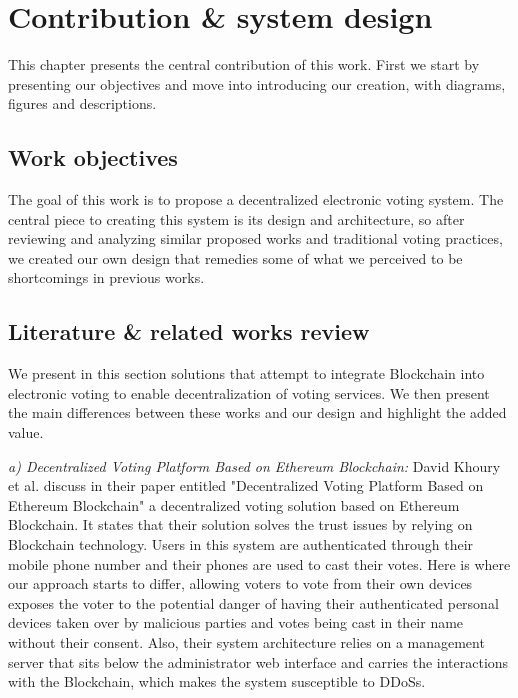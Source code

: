 \chapter{Contribution \& system design}

This chapter presents the central contribution of this work. First we start by presenting our objectives and move into introducing our creation, with diagrams, figures and descriptions.

\section{Work objectives}

The goal of this work is to propose a decentralized electronic voting system. The central piece to creating this system is its design and architecture, so after reviewing and analyzing similar proposed works \cite{khouryDecentralizedVotingPlatform2018}\cite{angsuchotmeteeBlockVOTEArchitectureBlockchainbased2019}\cite{ahlkvistDecentralizedVotingSystem2019} and traditional voting practices, we created our own design that remedies some of what we perceived to be shortcomings in previous works.

\section{Literature \& related works review}

We present in this section solutions that attempt to integrate Blockchain into electronic voting to enable decentralization of voting services. We then present the main differences between these works and our design and highlight the added value.

\textit{a) Decentralized Voting Platform Based on Ethereum
Blockchain:} David Khoury et al. discuss in their paper entitled "Decentralized Voting Platform Based on Ethereum
Blockchain"\cite{khouryDecentralizedVotingPlatform2018} a decentralized voting solution based on Ethereum Blockchain. It states that their solution solves the trust issues by relying on Blockchain technology. Users in this system are authenticated through their mobile phone number and their phones are used to cast their votes. Here is where our approach starts to differ, allowing voters to vote from their own devices exposes the voter to the potential danger of having their authenticated personal devices taken over by malicious parties and votes being cast in their name without their consent. Also, their system architecture relies on a management server that sits below the administrator web interface and carries the interactions with the Blockchain, which makes the system susceptible to \gls{DDoS}s.

